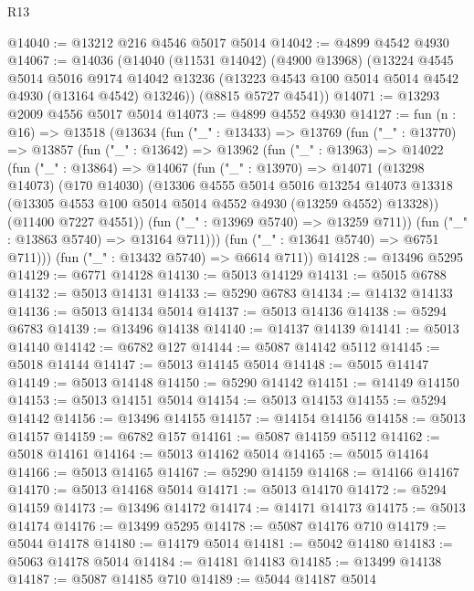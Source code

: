 \begin{lexlean}{R13}
\begin{coremodule}
@14040 := @13212 @216 @4546 @5017 @5014
@14042 := @4899 @4542 @4930
@14067 := @14036
    (@14040
      (@11531 @14042)
      (@4900 @13968)
      (@13224
        @4545
        @5014
        @5016
        @9174
        @14042
        @13236
        (@13223 @4543 @100 @5014 @5014 @4542 @4930 (@13164 @4542) @13246))
      (@8815 @5727 @4541))
@14071 := @13293 @2009 @4556 @5017 @5014
@14073 := @4899 @4552 @4930
@14127 := fun (n : @16) =>
  @13518
    (@13634
      (fun ("_" : @13433) =>
      @13769
        (fun ("_" : @13770) =>
        @13857
          (fun ("_" : @13642) =>
          @13962
            (fun ("_" : @13963) =>
            @14022
              (fun ("_" : @13864) =>
              @14067
                (fun ("_" : @13970) =>
                @14071
                  (@13298 @14073)
                  (@170 @14030)
                  (@13306
                    @4555
                    @5014
                    @5016
                    @13254
                    @14073
                    @13318
                    (@13305 @4553 @100 @5014 @5014 @4552 @4930 (@13259 @4552) @13328))
                  (@11400 @7227 @4551))
                (fun ("_" : @13969 @5740) => @13259 @711))
              (fun ("_" : @13863 @5740) => @13164 @711)))
          (fun ("_" : @13641 @5740) => @6751 @711)))
      (fun ("_" : @13432 @5740) => @6614 @711))
@14128 := @13496 @5295
@14129 := @6771 @14128
@14130 := @5013 @14129
@14131 := @5015 @6788
@14132 := @5013 @14131
@14133 := @5290 @6783
@14134 := @14132 @14133
@14136 := @5013 @14134 @5014
@14137 := @5013 @14136
@14138 := @5294 @6783
@14139 := @13496 @14138
@14140 := @14137 @14139
@14141 := @5013 @14140
@14142 := @6782 @127
@14144 := @5087 @14142 @5112
@14145 := @5018 @14144
@14147 := @5013 @14145 @5014
@14148 := @5015 @14147
@14149 := @5013 @14148
@14150 := @5290 @14142
@14151 := @14149 @14150
@14153 := @5013 @14151 @5014
@14154 := @5013 @14153
@14155 := @5294 @14142
@14156 := @13496 @14155
@14157 := @14154 @14156
@14158 := @5013 @14157
@14159 := @6782 @157
@14161 := @5087 @14159 @5112
@14162 := @5018 @14161
@14164 := @5013 @14162 @5014
@14165 := @5015 @14164
@14166 := @5013 @14165
@14167 := @5290 @14159
@14168 := @14166 @14167
@14170 := @5013 @14168 @5014
@14171 := @5013 @14170
@14172 := @5294 @14159
@14173 := @13496 @14172
@14174 := @14171 @14173
@14175 := @5013 @14174
@14176 := @13499 @5295
@14178 := @5087 @14176 @710
@14179 := @5044 @14178
@14180 := @14179 @5014
@14181 := @5042 @14180
@14183 := @5063 @14178 @5014
@14184 := @14181 @14183
@14185 := @13499 @14138
@14187 := @5087 @14185 @710
@14189 := @5044 @14187 @5014

\end{coremodule}
\end{lexlean}
